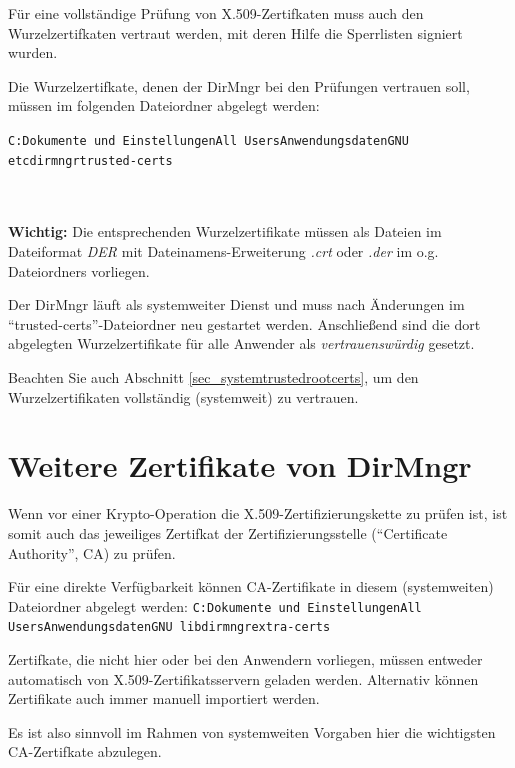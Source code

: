 \documentclass[a4paper,11pt, oneside,openright,titlepage,dvips]{scrbook}
\newcommand{\Filename}[1]{\texttt{#1}}
\newcommand\margin[1]{\marginline {\sffamily\scriptsize #1}}
\newcommand{\IncludeImage}[2][]{\texorhtml{%
\texttt{[image: \#2]}%
}{%
\htmlimg{#2.png}%
}}
\newcounter{chapter}
\newcounter{section}[chapter]
\begin{document}
Für eine vollständige Prüfung von X.509-Zertifkaten
muss auch den Wurzelzertifkaten vertraut werden, mit deren
Hilfe die Sperrlisten signiert wurden.

Die Wurzelzertifkate, denen der DirMngr bei den
Prüfungen vertrauen soll, müssen im folgenden Dateiordner abgelegt
werden:

\Filename{C:\back{}Dokumente und Einstellungen\back{}All
Users\back{}Anwendungsdaten\back{}GNU\back{}\T\newline
etc\back{}dirmngr\back{}trusted-certs\back{}}

\W~\\\\
\textbf{Wichtig:} Die entsprechenden Wurzelzertifikate müssen 
als Dateien im Dateiformat \textit{DER} mit Dateinamens-Erweiterung
\textit{.crt} oder \textit{.der}
im o.g. Dateiordners vorliegen.

Der DirMngr läuft als systemweiter Dienst und muss nach Änderungen im
"`trusted-certs"'-Dateiordner neu gestartet werden. Anschließend
sind die dort abgelegten Wurzelzertifikate für alle Anwender als
\textit{vertrauenswürdig} gesetzt.


Beachten Sie auch Abschnitt \ref{sec_systemtrustedrootcerts}, um den
Wurzelzertifikaten vollständig (systemweit) zu vertrauen.


\section{Weitere Zertifikate von DirMngr \label{extracertsdirmngr}}
\T\margin{\IncludeImage[width=1.5cm]{smime-icon}}

Wenn vor einer Krypto-Operation die X.509-Zertifizierungskette zu
prüfen ist, ist somit auch das jeweiliges Zertifkat der Zertifizierungsstelle
("`Certificate Authority"', CA) zu prüfen.

Für eine direkte Verfügbarkeit können CA-Zertifikate in diesem (systemweiten) 
Dateiordner abgelegt werden:\newline
\Filename{C:\back{}Dokumente und Einstellungen\back{}All 
Users\back{}Anwendungsdaten\back{}GNU\back{}\T\newline 
lib\back{}dirmngr\back{}extra-certs\back{}}

Zertifkate, die nicht hier oder bei den Anwendern vorliegen, müssen
entweder automatisch von X.509-Zertifikatsservern geladen werden.
Alternativ können Zertifikate auch immer manuell importiert werden.

Es ist also sinnvoll im Rahmen von systemweiten Vorgaben hier die
wichtigsten CA-Zertifkate abzulegen.
\end{document}
